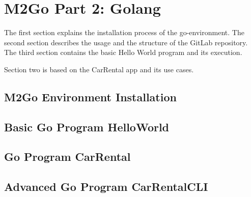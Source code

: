 \chapter{M2Go Part 2: Golang}
\label{cha:golang}
The first section explains the installation process of the go-environment.
The second section describes the usage and the structure of the GitLab repository.
The third section contains the basic Hello World program and its execution.

Section two is based on the CarRental app and its use cases.


\section{M2Go Environment Installation}




\section{Basic Go Program HelloWorld}



\section{Go Program CarRental}





\section{Advanced Go Program CarRentalCLI}




